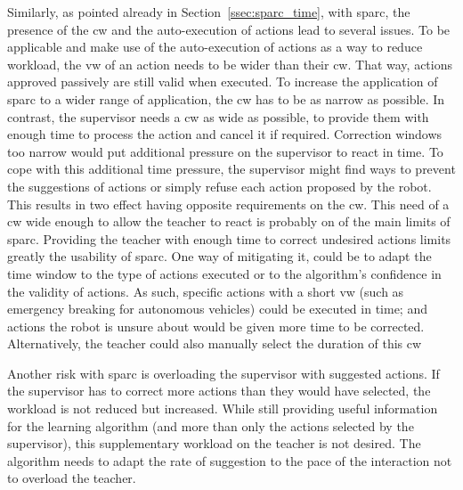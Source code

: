 Similarly, as pointed already in Section~\ref{ssec:sparc_time}, with \gls{sparc}, the presence of the \gls{cw} and the auto-execution of actions lead to several issues. To be applicable and make use of the auto-execution of actions as a way to reduce workload, the \gls{vw} of an action needs to be wider than their \gls{cw}. That way, actions approved passively are still valid when executed. To increase the application of \gls{sparc} to a wider range of application, the \gls{cw} has to be as narrow as possible. In contrast, the supervisor needs a \gls{cw} as wide as possible, to provide them with enough time to process the action and cancel it if required. Correction windows too narrow would put additional pressure on the supervisor to react in time. To cope with this additional time pressure, the supervisor might find ways to prevent the suggestions of actions or simply refuse each action proposed by the robot. This results in two effect having opposite requirements on the \gls{cw}. This need of a \gls{cw} wide enough to allow the teacher to react is probably on of the main limits of \gls{sparc}. Providing the teacher with enough time to correct undesired actions limits greatly the usability of \gls{sparc}. One way of mitigating it, could be to adapt the time window to the type of actions executed or to the algorithm's confidence in the validity of actions. As such, specific actions with a short \gls{vw} (such as emergency breaking for autonomous vehicles) could be executed in time; and actions the robot is unsure about would be given more time to be corrected. Alternatively, the teacher could also manually select the duration of this \gls{cw}

Another risk with \gls{sparc} is overloading the supervisor with suggested actions. If the supervisor has to correct more actions than they would have selected, the workload is not reduced but increased. While still providing useful information for the learning algorithm (and more than only the actions selected by the supervisor), this supplementary workload on the teacher is not desired. The algorithm needs to adapt the rate of suggestion to the pace of the interaction not to overload the teacher.

